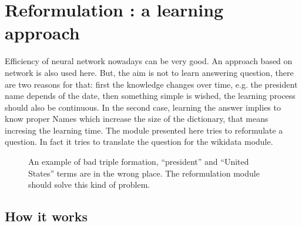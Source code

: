 \section{Reformulation : a learning approach }
\label{mlreformulation}

Efficiency of neural network nowadays can be very good. An approach based on network is also used here. But, the aim is not to learn answering question, there are two reasons for that: first the knowledge changes over time, e.g. the president name depends of the date, then something simple is wished, the learning process should also be continuous. In the second case, learning the answer implies to know proper Names which increase the size of the dictionary, that means incresing the learning time. The module presented here tries to reformulate a question. In fact it tries to translate the question for the wikidata module.

\begin{figure}
\begin{center}
 \caption{An example of bad triple formation, ``president'' and ``United States'' terms are in the wrong place. The reformulation module should solve this kind of problem.}
\end{center}
\end{figure}

\subsection{How it works}

